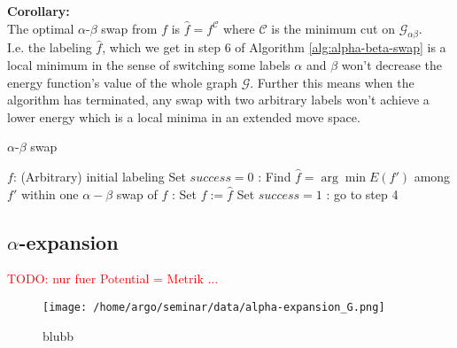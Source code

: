 \documentclass{scrartcl}[12pt, halfparskip]
\newcommand{\todo}[1]{\textcolor{red}{TODO: #1}}
\begin{document}
\textbf{Corollary:}\\
The optimal $\alpha$-$\beta$ swap from $f$ is $\hat{f} = f^\mathcal{C}$ where $\mathcal{C}$ is the minimum cut on $\mathcal{G}_{\alpha \beta}$. \\


I.e. the labeling $\hat{f}$, which we get in step 6 of Algorithm \ref{alg:alpha-beta-swap} is a local minimum in the sense of switching some labels $\alpha$ and $\beta$ won't decrease the energy function's value of the whole graph $\mathcal{G}$. Further this means when the algorithm has terminated, any swap with two arbitrary labels won't achieve a lower energy which is a local minima in an extended move space.



\begin{algorithm}[H]
\caption{$\alpha$-$\beta$ swap}\label{alg:alpha-beta-swap}
\begin{algorithmic}[1]
	\State $f$: (Arbitrary) initial labeling 
	\State
	\State Set $success = 0$
	:
		\State Find $\hat{f} = \arg \min E(f')$ among $f'$ within one $\alpha-\beta$ swap of $f$
		:
			\State Set $f := \hat{f}$
			\State Set $success = 1$
		\EndIf
	\EndFor
	:
		\State go to step 4
	\EndIf
	\State
	\State {}
\EndProcedure
\end{algorithmic}
\end{algorithm}








\subsection{$\alpha$-expansion}

\todo{nur fuer Potential = Metrik ...}


\begin{wrapfigure}{r}{0.5\textwidth}
	\vspace{-1.5cm}
	\texttt{[image: /home/argo/seminar/data/alpha-expansion\_G.png]}
	\caption{blubb}
	\label{fig:alpha-expansion_Gab}
\end{wrapfigure}
\end{document}
